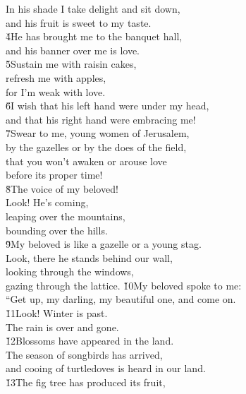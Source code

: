\begin{poetry}
\poeml In his shade I take delight and sit down, \\
\poemll    and his fruit is sweet to my taste. \\
\poeml \v{4}He has brought me to the banquet hall, \\
\poemll    and his banner over me is love. \\
\poeml \v{5}Sustain me with raisin cakes, \\
\poemll    refresh me with apples, \\
\poemlll       for I'm weak with love. \\
\poeml \v{6}I wish that his left hand were under my head, \\
\poemll    and that his right hand were embracing me! \\
\poeml \v{7}Swear to me, young women of Jerusalem, \\
\poemll    by the gazelles or by the does of the field, \\
\poeml that you won't awaken or arouse love \\
\poemll    before its proper time! \\
\poeml \v{8}The voice of my beloved! \\
\poeml Look! He's coming, \\
\poemll    leaping over the mountains, \\
\poemlll       bounding over the hills. \\
\poeml \v{9}My beloved is like a gazelle or a young stag. \\
\poeml Look, there he stands behind our wall, \\
\poemll    looking through the windows, \\
\poemlll       gazing through the lattice.
\poeml \v{10}My beloved spoke to me: \\
\poemll    ``Get up, my darling, my beautiful one, and come on. \\
\poeml \v{11}Look! Winter is past. \\
\poemll    The rain is over and gone. \\
\poeml \v{12}Blossoms have appeared in the land. \\
\poemll    The season of songbirds has arrived, \\
\poemlll       and cooing of turtledoves is heard in our land. \\
\poeml \v{13}The fig tree has produced its fruit, \\

\end{poetry}
